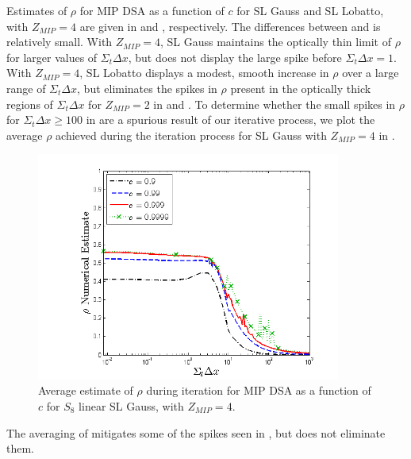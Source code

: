 Estimates of $\rho$ for MIP DSA as a function of $c$ for SL Gauss and SL Lobatto, with $Z_{MIP}=4$ are given in  and , respectively.
The differences between  and  is relatively small.  With $Z_{MIP}=4$, SL Gauss maintains the optically thin limit of $\rho$ for larger values of $\Sigma_t \Delta x$, but does not display the large spike before $\Sigma_t \Delta x =1$.
With $Z_{MIP}=4$, SL Lobatto displays a modest, smooth increase in $\rho$ over a large range of $\Sigma_t \Delta x$, but eliminates the spikes in $\rho$ present in the optically thick regions of $\Sigma_t \Delta x$ for $Z_{MIP}=2$ in  and .
To determine whether the small spikes in $\rho$ for $\Sigma_t \Delta x \geq 100$ in  are a spurious result of our iterative process, we plot the average $\rho$ achieved during the iteration process for SL Gauss with $Z_{MIP}=4$ in .
\begin{figure}[!hbp]
\centering
\includegraphics[width=10cm]{chapter4_acceleration/Const_4_bar_Constant_XS_c_comparions_MIP_Gauss.png}
\caption{Average estimate  of $\rho$ during iteration for MIP DSA as a function of $c$  for  $S_8$  linear SL Gauss, with $Z_{MIP}=4$.}
\label{fig:mip_gauss_as_fun_c_z4_bar}
\end{figure}
The averaging of  mitigates some of the spikes seen in , but does not eliminate them.

